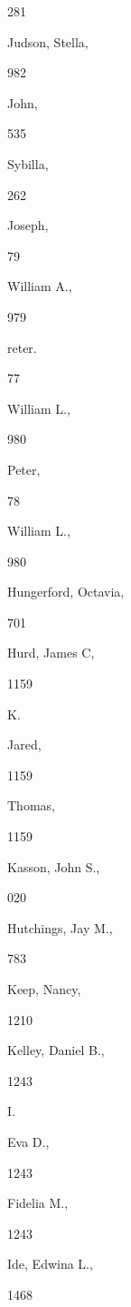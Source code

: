\documentclass{book}
\begin{document}
{{{{281 


Judson, Stella, 


982 


John, 


535 


Sybilla, 


262 


Joseph, 


79 


William A., 


979 


reter. 


77 


William L., 


980 


Peter, 


78 


William L., 


980 


Hungerford, Octavia, 


701 






Hurd, James C, 


1159 


K. 




Jared, 


1159 






Thomas, 


1159 


Kasson, John S., 


020 


Hutchings, Jay M., 


783 


Keep, Nancy, 


1210 






Kelley, Daniel B., 


1243 


I. 




Eva D., 


1243 






Fidelia M., 


1243 


Ide, Edwina L., 


1468 


}}}}
\end{document}

